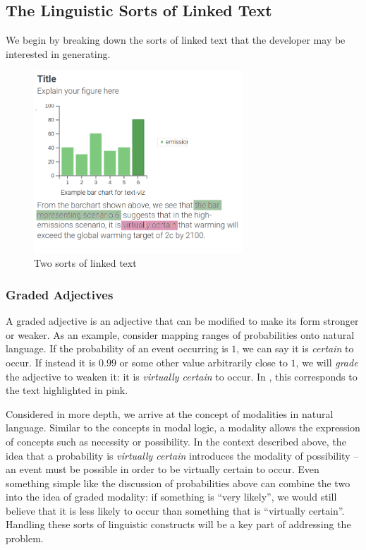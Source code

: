 \subsection{The Linguistic Sorts of Linked Text}
We begin by breaking down the sorts of linked text that the developer may
be interested in generating. 

\begin{figure}
   \includegraphics[width=0.7\textwidth]{fig/text-viz-types.png}
   \caption{Two sorts of linked text}
   \label{fig:linked-text-types}
\end{figure}

\subsubsection{Graded Adjectives}
A graded adjective is an adjective that can be modified to make its form stronger or weaker.
As an example, consider mapping ranges of probabilities onto natural language. If the probability
of an event occurring is $1$, we can say it is \emph{certain} to occur. If instead it is $0.99$
or some other value arbitrarily close to $1$, we will \emph{grade} the adjective to weaken it:
it is \emph{virtually certain} to occur. In , this corresponds to the text
highlighted in pink.

Considered in more depth, we arrive at the concept of modalities in natural language. Similar to 
the concepts in modal logic, a modality allows the expression of concepts such as necessity or possibility.
In the context described above, the idea that a probability is \emph{virtually certain} introduces the modality of
possibility -- an event must be possible in order to be virtually certain to occur. Even something simple
like the discussion of probabilities above can combine the two into the idea of graded modality:
if something is ``very likely'', we would still believe that it is less likely to occur than something that
is ``virtually certain''. Handling these sorts of linguistic constructs will be a key part of addressing
the problem. 

